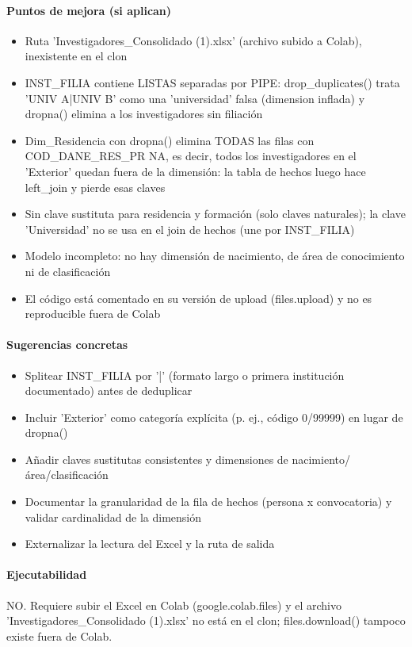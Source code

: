 \paragraph{Puntos de mejora (si aplican)}
\begin{itemize}
  \item Ruta 'Investigadores\_Consolidado (1).xlsx' (archivo subido a Colab), inexistente en el clon
  \item INST\_FILIA contiene LISTAS separadas por PIPE: drop\_duplicates() trata 'UNIV A|UNIV B' como una 'universidad' falsa (dimension inflada) y dropna() elimina a los investigadores sin filiación
  \item Dim\_Residencia con dropna() elimina TODAS las filas con COD\_DANE\_RES\_PR NA, es decir, todos los investigadores en el 'Exterior' quedan fuera de la dimensión: la tabla de hechos luego hace left\_join y pierde esas claves
  \item Sin clave sustituta para residencia y formación (solo claves naturales); la clave 'Universidad' no se usa en el join de hechos (une por INST\_FILIA)
  \item Modelo incompleto: no hay dimensión de nacimiento, de área de conocimiento ni de clasificación
  \item El código está comentado en su versión de upload (files.upload) y no es reproducible fuera de Colab
\end{itemize}

\paragraph{Sugerencias concretas}
\begin{itemize}
  \item Splitear INST\_FILIA por '|' (formato largo o primera institución documentado) antes de deduplicar
  \item Incluir 'Exterior' como categoría explícita (p. ej., código 0/99999) en lugar de dropna()
  \item Añadir claves sustitutas consistentes y dimensiones de nacimiento/área/clasificación
  \item Documentar la granularidad de la fila de hechos (persona x convocatoria) y validar cardinalidad de la dimensión
  \item Externalizar la lectura del Excel y la ruta de salida
\end{itemize}

\paragraph{Ejecutabilidad}
NO. Requiere subir el Excel en Colab (google.colab.files) y el archivo 'Investigadores\_Consolidado (1).xlsx' no está en el clon; files.download() tampoco existe fuera de Colab.

